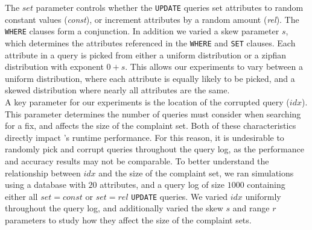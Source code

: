 The $set$ parameter controls whether the \texttt{UPDATE} queries set attributes to random constant values ({\it const}),  
or increment attributes by a random amount ({\it rel}).  The \texttt{WHERE} clauses form a conjunction.
In addition we varied a skew parameter $s$, which determines the attributes referenced in the \texttt{WHERE}
and \texttt{SET} clauses.  Each attribute in a query is picked from either a uniform distribution or 
a zipfian~\cite{zipf} distribution
with exponent $0+s$.  This allows our experiments to vary between a uniform distribution, where each attribute is
equally likely to be picked, and a skewed distribution where nearly all attributes are the same. \\

{}
A key parameter for our experiments is the location of the corrupted query ($idx$).  
This parameter determines the number of queries \sys must consider when searching for a fix,
and affects the size of the complaint set.  
Both of these characteristics directly impact \sys's 
runtime performance. For this reason, it is undesirable to randomly pick and corrupt queries
throughout the query log, as the performance and accuracy results may not be comparable. 
To better understand the relationship between $idx$ and the size of the complaint set, we ran
simulations using a database with $20$ attributes, and a query log of size $1000$ containing
either all $set = const$ or $set = rel$ \texttt{UPDATE} queries.
We varied  $idx$ uniformly throughout the query log, and additionally varied
the skew $s$ and range $r$ parameters to study how they affect the size of the complaint sets.


